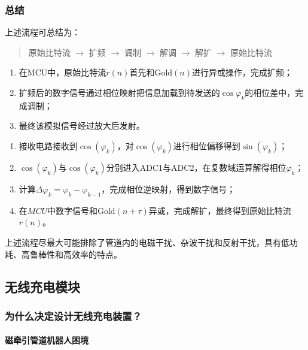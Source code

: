 \documentclass[12pt, a4paper]{article}
\begin{document}
\subsubsection{总结}

上述流程可总结为：

\begin{quote}
原始比特流 $\rightarrow$ 扩频 $\rightarrow$ 调制 $\rightarrow$ 解调 $\rightarrow$ 解扩 $\rightarrow$ 原始比特流
\end{quote}

\begin{tcolorbox}[title=发送端]
\begin{enumerate}
    \item 在MCU中，原始比特流$r(n)$首先和$\text{Gold}(n)$进行异或操作，完成扩频；
    \item 扩频后的数字信号通过相位映射把信息加载到待发送的$\cos\varphi_k$的相位差中，完成调制；
    \item 最终该模拟信号经过放大后发射。
\end{enumerate}
\end{tcolorbox}

\begin{tcolorbox}[title=接收端]
\begin{enumerate}
    \item 接收电路接收到$\cos(\varphi_k)$，对$\cos(\varphi_k)$进行相位偏移得到$\sin(\varphi_k)$；
    \item $\cos(\varphi_k)$与$\cos(\varphi_k)$分别进入ADC1与ADC2，在复数域运算解得相位$\varphi_k$；
    \item 计算$\Delta\varphi_k=\varphi_k-\varphi_{k-1}$，完成相位逆映射，得到数字信号；
    \item 在$MCU$中数字信号和$\text{Gold}(n+\tau)$异或，完成解扩，最终得到原始比特流$r(n)$。
\end{enumerate}
\end{tcolorbox}

上述流程尽最大可能排除了管道内的电磁干扰、杂波干扰和反射干扰，具有低功耗、高鲁棒性和高效率的特点。

\subsection{无线充电模块}

\subsubsection{为什么决定设计无线充电装置？}

\paragraph{磁牵引管道机器人困境}
\end{document}
